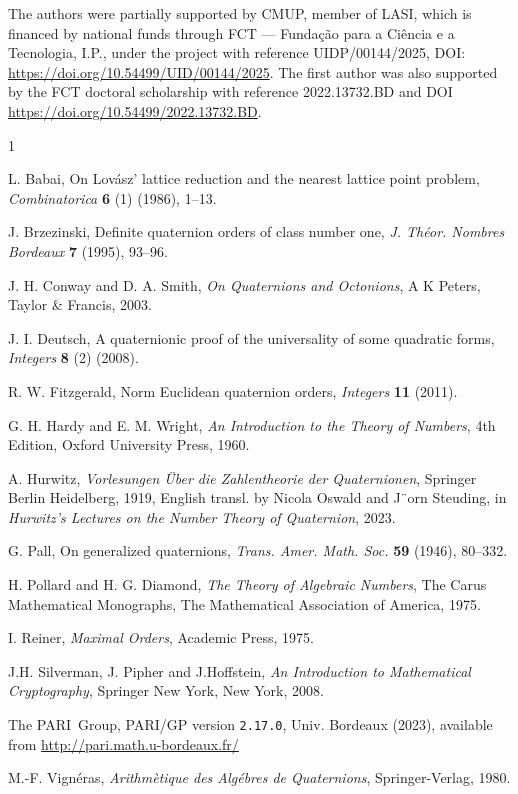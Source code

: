 \documentclass[10pt]{article}
\theoremstyle{definition}
\begin{document}
\normalsize

\vskip20pt  The authors were partially
supported by CMUP, member of LASI, which is financed by national funds
through FCT --- Fundação para a Ciência e a Tecnologia, I.P., under
the project with reference UIDP/00144/2025, DOI:
\url{https://doi.org/10.54499/UID/00144/2025}. The first author was
also supported by the FCT doctoral scholarship with reference
2022.13732.BD and DOI \url{https://doi.org/10.54499/2022.13732.BD}.

\begin{thebibliography}{1}\footnotesize
	
 L. Babai, On Lovász' lattice reduction and the nearest
  lattice point problem, {\it Combinatorica} {\bf 6} (1) (1986),
  1--13.
	
 J. Brzezinski, Definite quaternion orders of
  class number one, { \it J. Théor. Nombres Bordeaux } {\bf 7} (1995),
  93--96.
	
 J. H. Conway and D. A. Smith, { \it On
    Quaternions and Octonions}, A K Peters, Taylor \& Francis, 2003.
	
 J. I. Deutsch, A quaternionic proof of the
  universality of some quadratic forms, {\it Integers} {\bf 8} (2)
  (2008).
	
 R. W. Fitzgerald, Norm Euclidean quaternion
  orders, {\it Integers} {\bf 11} (2011).
	
 G. H. Hardy and E. M. Wright, {\it An
    Introduction to the Theory of Numbers}, 4th Edition, Oxford
  University Press, 1960.
	
 A. Hurwitz, {\it Vorlesungen \"Uber die
    Zahlentheorie der Quaternionen}, Springer Berlin Heidelberg, 1919,
  English transl. by Nicola Oswald and J¨orn Steuding, in {\it
    Hurwitz’s Lectures on the Number Theory of Quaternion}, 2023.
	
 G. Pall, On generalized quaternions, {\it
    Trans. Amer. Math. Soc.} {\bf 59} (1946), 80--332.
	
 H. Pollard and H. G. Diamond, {\it The
    Theory of Algebraic Numbers}, The Carus Mathematical Monographs,
  The Mathematical Association of America, 1975.
	
 I. Reiner, {\it Maximal Orders}, Academic Press,
  1975.
	
 J.H. Silverman, J. Pipher and J.Hoffstein, {\it An
    Introduction to Mathematical Cryptography}, Springer New York, New
  York, 2008.
	
 The PARI~Group, PARI/GP version \texttt{2.17.0},
  Univ. Bordeaux (2023), available from
  \url{http://pari.math.u-bordeaux.fr/}
	
 M.-F. Vignéras, {\it Arithmètique des Algébres de
    Quaternions}, Springer-Verlag, 1980.
	
\end{thebibliography} 
\end{document}

